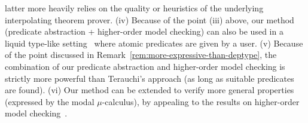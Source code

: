 latter more heavily relies on the quality or heuristics of the 
underlying interpolating theorem prover.
%
%
(iv) Because of the point (iii) above, our method (predicate abstraction 
+ higher-order model checking) can also be used in a liquid type-like 
setting~\cite{Rondon2008} where atomic predicates are given by a user.
(v) Because of the point discussed in 
Remark~\ref{rem:more-expressive-than-deptype}, the combination of our 
predicate abstraction and higher-order model checking is strictly more 
powerful than Terauchi's approach (as long as suitable predicates are 
found).
%
(vi) Our method can be extended to verify more general properties 
(expressed by the modal \(\mu\)-calculus), by appealing to the results 
on higher-order model checking~\cite{Ong2006,Kobayashi2009a}.
